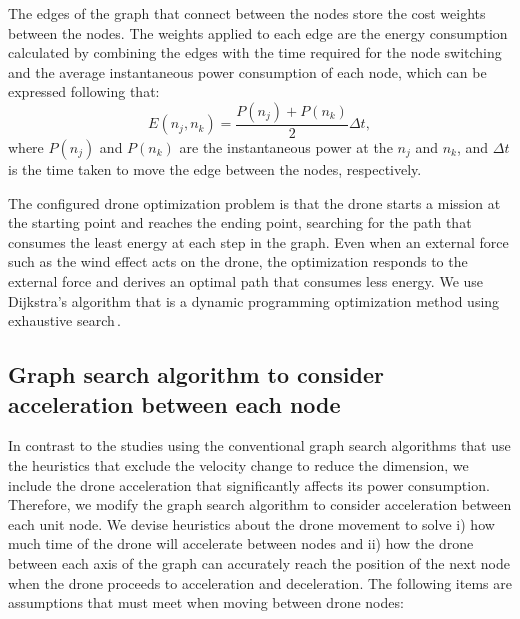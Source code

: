 \documentclass[journal]{./template/IEEEtran}
\begin{document}
\noindent The edges of the graph that connect between the nodes store the cost weights between the nodes.
The weights applied to each edge are the energy consumption calculated by combining the edges with the time required for the node switching and the average instantaneous power consumption of each node, which can be expressed following that: 
\begin{equation*}
E(n_j, n_k) = \frac{P(n_j)+P(n_k)}{2} \Delta t,
\end{equation*}
where $P(n_j)$ and $P(n_k)$ are the instantaneous power at the $n_j$ and $n_k$, and $\Delta t$ is the time taken to move the edge between the nodes, respectively.

The configured drone optimization problem is that the drone starts a mission at the starting point and reaches the ending point, searching for the path that consumes the least energy at each step in the graph. 
Even when an external force such as the wind effect acts on the drone, the optimization responds to the external force and derives an optimal path that consumes less energy.
We use Dijkstra's algorithm that is a dynamic programming optimization method using exhaustive search\,\cite{ref_19}. 




\subsection{Graph search algorithm to consider acceleration between each node}
\label{sub_Section: Graph search}

In contrast to the studies using the conventional graph search algorithms that use the heuristics that exclude the velocity change to reduce the dimension, we include the drone acceleration that significantly affects its power consumption. 
Therefore, we modify the graph search algorithm to consider acceleration between each unit node. 
We devise heuristics about the drone movement to solve i) how much time of the drone will accelerate between nodes and ii) how the drone between each axis of the graph can accurately reach the position of the next node when the drone proceeds to acceleration and deceleration. 
The following items are assumptions that must meet when moving between drone nodes:
\end{document}
